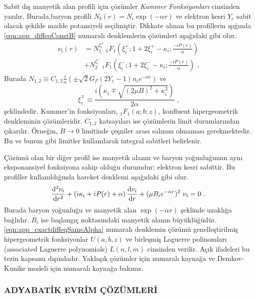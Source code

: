 Sabit dış manyetik alan profili için çözümler \emph{Kummer Fonksiyonları} cinsinden yazılır. Burada,baryon profili $ N_{b}(r) = N_{i}\exp(-\alpha r) $ ve elektron kesri $ Y_{e} $ sabit olacak şekilde madde potansiyeli seçilmiştir. Dikkate alınan bu profillerin ışığında \eqref{eqn:app_diffeqConstB} numaralı denklemlerin çözümleri aşağıdaki gibi olur.
\begin{align}
    \nonumber \nu_{i}(r) & = N_{1}^{\xi^{+}_{i}}~ _{1}F_{1}\left(\xi^{+}_{i}; 
    1+2\xi^{+}_{i}-\kappa_{i};\frac{-iP(r)}{\alpha} \right) \\
    & + N_{2}^{\xi^{-}_{i}} ~ _{1}F_{1}\left(\xi^{-}_{i}; 1+2\xi^{-}_{i}-
    \kappa_{i};\frac{-iP(r)}{\alpha}\right) \text{ ,}
\end{align}
Burada $N_{1,2} \equiv C_{1,2}\frac{i}{\alpha} (\pm \sqrt{2}G_{F}(2Y_{e}-1)n_{i}e^{-\alpha r} )$ ve
\begin{equation}
  \xi^{\mp}_{i} \equiv \frac{i(\kappa_{i} \mp \sqrt{(2\mu B)^{2} + 
  \kappa^{2}_{i} } )}{2\alpha} \text{ ,}
\end{equation}
şeklindedir. Kummer'in fonksiyonları, $ _{1}F_{1}(a;b;z) $, konfluent hipergeometrik denkleminin çözümleridir. $ C_{1,2} $ katsayıları ise çözümlerin limit durumlarından çıkarılır. Örneğin, $ B \rightarrow 0 $ limitinde çeşniler arası salınım olmaması gerekmektedir. Bu ve bunun gibi limitler kullanılarak integral sabitleri belirlenir.

Çözümü olan bir diğer profil ise manyetik alanın ve baryon yoğunluğunun aynı eksponansiyel fonksiyona sahip olduğu durumdur; elektron kesri sabittir. Bu profiller kullanıldığında hareket denklemi aşağıdaki gibi olur.
\begin{equation}\label{eqn:app_exactdiffeqSameAlpha}
    \dv[2]{\nu_{i}}{r} + \left(i\kappa_{i}+iP(r) + \alpha\right)
    \dv{\nu_{i}}{r}+ (\mu B_{i}e^{-\alpha r})^{2}~ \nu_{i} = 0 \text{ .}
\end{equation}
Burada baryon yoğunluğu ve manyetik alan $ \exp(-\alpha r) $ şeklinde uzaklığa bağlıdır. $ B_{i} $ ise başlangıç noktasındaki manyetik alanın büyüklüğüdür. \eqref{eqn:app_exactdiffeqSameAlpha} numaralı denklemin çözümü genelleştirilmiş hipergeometrik fonksiyonlar $ U(a,b,z) $ ve birleşmiş Laguerre polinomları (associated Laguerre polynomials) $ L(n,l,m) $ cinsinden verilir. Açık ifadeleri bu tezin kapsamı dışındadır. Yaklaşık çözümler için \cite{Balantekin:2004tk} numaralı kaynağa ve Demkov-Kunike modeli için \cite{Joshi:2019dcj} numaralı kaynağa bakınız.

\subsubsection{ADYABATİK EVRİM ÇÖZÜMLERİ}
